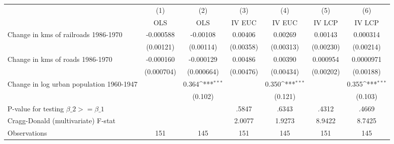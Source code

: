 {
\def\sym#1{\ifmmode^{#1}\else\(^{#1}\)\fi}
\begin{tabular}{l*{6}{c}}
\hline\hline
                &\multicolumn{1}{c}{(1)}&\multicolumn{1}{c}{(2)}&\multicolumn{1}{c}{(3)}&\multicolumn{1}{c}{(4)}&\multicolumn{1}{c}{(5)}&\multicolumn{1}{c}{(6)}\\
                &\multicolumn{1}{c}{OLS}&\multicolumn{1}{c}{OLS}&\multicolumn{1}{c}{IV EUC}&\multicolumn{1}{c}{IV EUC}&\multicolumn{1}{c}{IV LCP}&\multicolumn{1}{c}{IV LCP}\\
\hline
Change in kms of railroads 1986-1970&-0.000588         & -0.00108         &  0.00406         &  0.00269         &  0.00143         & 0.000314         \\
                &(0.00121)         &(0.00114)         &(0.00358)         &(0.00313)         &(0.00230)         &(0.00214)         \\
[1em]
Change in kms of roads 1986-1970&-0.000160         &-0.000129         &  0.00486         &  0.00390         & 0.000954         &0.0000971         \\
                &(0.000704)         &(0.000664)         &(0.00476)         &(0.00434)         &(0.00202)         &(0.00188)         \\
[1em]
Change in log urban population 1960-1947&                  &    0.364\sym{***}&                  &    0.350\sym{***}&                  &    0.355\sym{***}\\
                &                  &  (0.102)         &                  &  (0.121)         &                  &  (0.103)         \\
\hline
P-value for testing $\beta\_{2} >= \beta\_{1}$&                  &                  &    .5847         &    .6343         &    .4312         &    .4669         \\
Cragg-Donald (multivariate) F-stat&                  &                  &   2.0077         &   1.9273         &   8.9422         &   8.7425         \\
Observations    &      151         &      145         &      151         &      145         &      151         &      145         \\
\hline\hline
\end{tabular}
}

